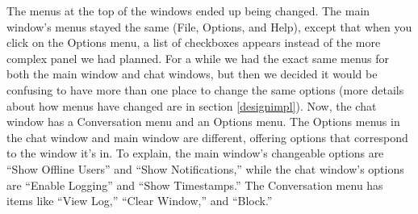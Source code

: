 The menus at the top of the windows ended up being changed. The main window's menus stayed the same (File, Options, and Help), except that when you click on the Options menu, a list of checkboxes appears instead of the more complex panel we had planned. For a while we had the exact same menus for both the main window and chat windows, but then we decided it would be confusing to have more than one place to change the same options (more details about how menus have changed are in section \ref{designimpl}). Now, the chat window has a Conversation menu and an Options menu. The Options menus in the chat window and main window are different, offering options that correspond to the window it's in. To explain, the main window's changeable options are ``Show Offline Users'' and ``Show Notifications,'' while the chat window's options are ``Enable Logging'' and ``Show Timestamps.'' The Conversation menu has items like ``View Log,'' ``Clear Window,'' and ``Block.''

